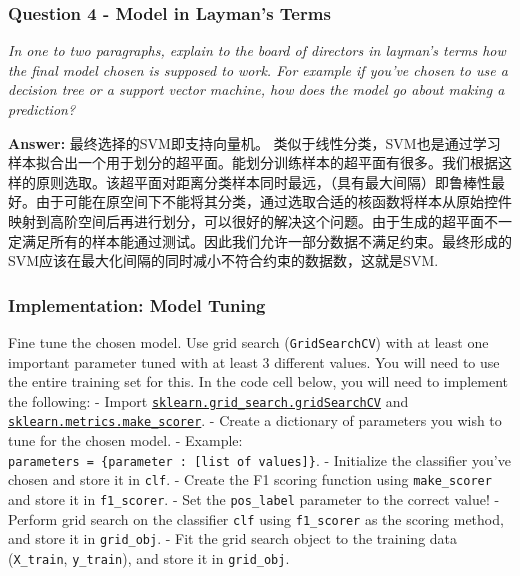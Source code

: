 \documentclass{ctexart}
\begin{document}
    \subsubsection{Question 4 - Model in Layman's
Terms}\label{question-4---model-in-laymans-terms}

\emph{In one to two paragraphs, explain to the board of directors in
layman's terms how the final model chosen is supposed to work. For
example if you've chosen to use a decision tree or a support vector
machine, how does the model go about making a prediction?}

    \textbf{Answer: } 最终选择的SVM即支持向量机。
类似于线性分类，SVM也是通过学习样本拟合出一个用于划分的超平面。能划分训练样本的超平面有很多。我们根据这样的原则选取。该超平面对距离分类样本同时最远，（具有最大间隔）即鲁棒性最好。由于可能在原空间下不能将其分类，通过选取合适的核函数将样本从原始控件映射到高阶空间后再进行划分，可以很好的解决这个问题。由于生成的超平面不一定满足所有的样本能通过测试。因此我们允许一部分数据不满足约束。最终形成的SVM应该在最大化间隔的同时减小不符合约束的数据数，这就是SVM.

    \subsubsection{Implementation: Model
Tuning}\label{implementation-model-tuning}

Fine tune the chosen model. Use grid search (\texttt{GridSearchCV}) with
at least one important parameter tuned with at least 3 different values.
You will need to use the entire training set for this. In the code cell
below, you will need to implement the following: - Import
\href{http://scikit-learn.org/stable/modules/generated/sklearn.grid_search.GridSearchCV.html}{\texttt{sklearn.grid\_search.gridSearchCV}}
and
\href{http://scikit-learn.org/stable/modules/generated/sklearn.metrics.make_scorer.html}{\texttt{sklearn.metrics.make\_scorer}}.
- Create a dictionary of parameters you wish to tune for the chosen
model. - Example:
\texttt{parameters\ =\ \{\textquotesingle{}parameter\textquotesingle{}\ :\ {[}list\ of\ values{]}\}}.
- Initialize the classifier you've chosen and store it in \texttt{clf}.
- Create the F1 scoring function using \texttt{make\_scorer} and store
it in \texttt{f1\_scorer}. - Set the \texttt{pos\_label} parameter to
the correct value! - Perform grid search on the classifier \texttt{clf}
using \texttt{f1\_scorer} as the scoring method, and store it in
\texttt{grid\_obj}. - Fit the grid search object to the training data
(\texttt{X\_train}, \texttt{y\_train}), and store it in
\texttt{grid\_obj}.
\end{document}
